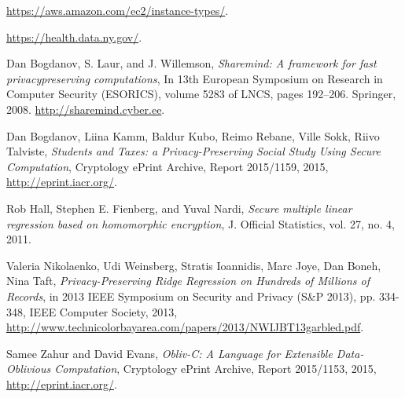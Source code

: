 \documentclass[conference]{IEEEtran}
\begin{document}
\begin{thebibliography}{1}

  \url{https://aws.amazon.com/ec2/instance-types/}.

  \url{https://health.data.ny.gov/}.

Dan Bogdanov, S. Laur, and J. Willemson,
\emph{Sharemind: A framework for fast privacypreserving
computations}, In 13th European Symposium on Research in Computer
Security (ESORICS), volume 5283 of LNCS, pages 192–206. Springer, 2008.
\url{http://sharemind.cyber.ee}.

    Dan Bogdanov, Liina Kamm, Baldur Kubo, Reimo Rebane, Ville Sokk, Riivo Talviste,
    \emph{Students and Taxes: a Privacy-Preserving Social Study Using Secure Computation},
    Cryptology ePrint Archive, Report 2015/1159,
    2015,
    \url{http://eprint.iacr.org/}.

  Rob Hall, Stephen E. Fienberg, and Yuval Nardi, 
  \emph{Secure multiple linear regression based on homomorphic encryption}, 
  J. Official Statistics, vol. 27, no. 4, 2011.

 Valeria Nikolaenko, Udi Weinsberg, Stratis Ioannidis, Marc Joye, Dan Boneh, Nina Taft,
 \emph{Privacy-Preserving Ridge Regression on Hundreds of Millions of Records},
 in 2013 IEEE Symposium on Security and Privacy (S\&P 2013), pp. 334-348, 
 IEEE Computer Society, 2013,
 \url{http://www.technicolorbayarea.com/papers/2013/NWIJBT13garbled.pdf}.

  Samee Zahur and David Evans, \emph{Obliv-C: A Language for Extensible 
  Data-Oblivious Computation}, Cryptology ePrint Archive, 
  Report 2015/1153, 2015, 
  \url{http://eprint.iacr.org/}.

\end{thebibliography}
\end{document}
